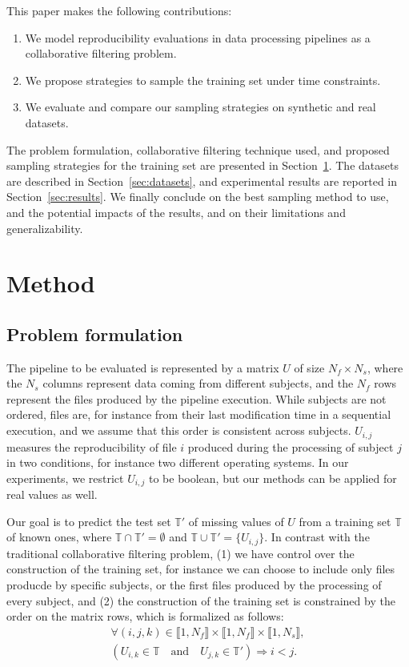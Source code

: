 \documentclass[10pt, conference, compsocconf]{IEEEtran}
\begin{document}
This paper makes the following contributions:
\begin{enumerate}
\item We model reproducibility evaluations in data processing pipelines as a collaborative filtering problem.
\item We propose strategies to sample the training set under time constraints.
\item We evaluate and compare our sampling strategies on synthetic and real datasets.
\end{enumerate}
The problem formulation, collaborative filtering technique used, and 
proposed sampling strategies for the training set are presented in 
Section~\ref{sec:methods}. The datasets are described in 
Section~\ref{sec:datasets}, and experimental results are reported in 
Section~\ref{sec:results}.
We finally conclude on the best sampling method to use, and the 
potential impacts of the results, and on their limitations and 
generalizability.

\section{Method}
\label{sec:methods}
\subsection{Problem formulation}

The pipeline to be evaluated is represented by a matrix $U$ of size 
$N_f \times N_s$, where the $N_s$ columns represent data coming from 
different subjects, and the $N_f$ rows represent the files produced by 
the pipeline execution. While subjects are not ordered, files are, for 
instance from their last modification time in a sequential execution, 
and we assume that this order is consistent across subjects. $U_{i, j}$ 
measures the reproducibility of file $i$ produced during the processing 
of subject $j$ in two conditions, for instance two different 
operating systems. In our experiments, we restrict $U_{i,j}$ to be 
boolean, but our methods can be applied for real values as well. 

Our goal is to predict the test set $\mathbb{T'}$ of missing values of 
$U$ from a training set $\mathbb{T}$ of known ones, where $\mathbb{T} 
\cap \mathbb{T'} = \emptyset$ and $\mathbb{T} \cup \mathbb{T'} = 
\{U_{i,j}\}$. In contrast with the traditional collaborative filtering 
problem, (1) we have control over the construction of the training set, 
for instance we can choose to include only files producde by specific 
subjects, or the first files produced by the processing of every 
subject, and (2) the construction of the training set is constrained by 
the 
order on the matrix rows, which is formalized as follows: 
\begin{equation}
\begin{array}{l}
\forall (i, j, k) \in \llbracket 1, N_f \rrbracket \times \llbracket 1, N_f \rrbracket \times \llbracket 1, N_s \rrbracket, \\
 \left( U_{i,k} \in \mathbb{T} \quad \mathrm{and} \quad U_{j,k} \in \mathbb{T'} \right) \Rightarrow i < j. \label{eq:time}
 \end{array}
\end{equation}
\end{document}
